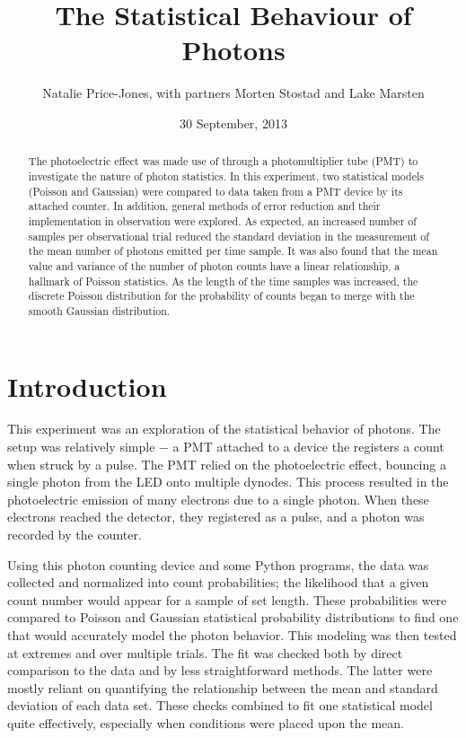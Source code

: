 \documentclass[a4paper,12pt]{article}
\begin{document}
\onehalfspacing
\title{The Statistical Behaviour of Photons}
\author{Natalie Price-Jones, with partners Morten Stostad and Lake Marsten}
\date{30 September, 2013}
\maketitle

\begin{abstract}
\label{abstract}

The photoelectric effect was made use of through a photomultiplier tube (PMT) to investigate the nature of photon statistics. In this experiment, two statistical models (Poisson and Gaussian) were compared to data taken from a PMT device by its attached counter. In addition, general methods of error reduction and their implementation in observation were explored. As expected, an increased number of samples per observational trial reduced the standard deviation in the measurement of the mean number of photons emitted per time sample. It was also found that the mean value and variance of the number of photon counts have a linear relationship, a hallmark of Poisson statistics. As the length of the time samples was increased, the discrete Poisson distribution for the probability of counts began to merge with the smooth Gaussian distribution.

\end{abstract}

\section{Introduction}
\label{sec:introduction}

This experiment was an exploration of the statistical behavior of photons. The setup was relatively simple $-$ a PMT attached to a device the registers a count when struck by a pulse. The PMT relied on the photoelectric effect, bouncing a single photon from the LED onto multiple dynodes. This process resulted in the photoelectric emission of many electrons due to a single photon. When these electrons reached the detector, they registered as a pulse, and a photon was recorded by the counter.

Using this photon counting device and some Python programs, the data was collected and normalized into count probabilities; the likelihood that a given count number would appear for a sample of set length. These probabilities were compared to Poisson and Gaussian statistical probability distributions to find one that would accurately model the photon behavior. This modeling was then tested at extremes and over multiple trials. The fit was checked both by direct comparison to the data and by less straightforward methods. The latter were mostly reliant on quantifying the relationship between the mean and standard deviation of each data set. These checks combined to fit one statistical model quite effectively, especially when conditions were placed upon the mean.
\end{document}
